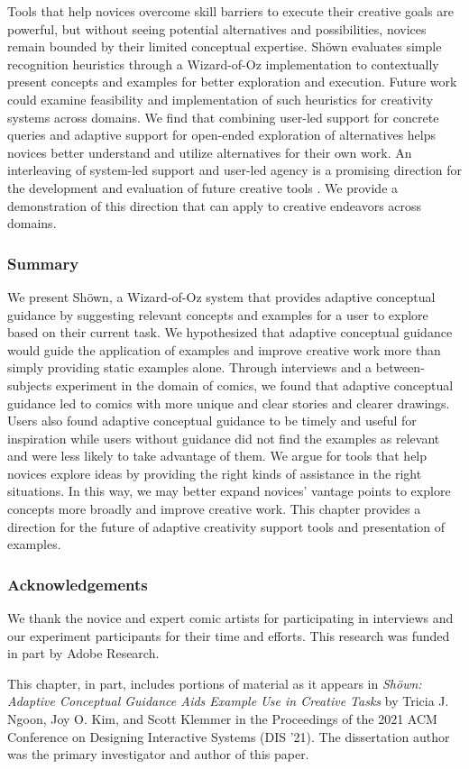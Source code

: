 Tools that help novices overcome skill barriers to execute their creative goals are powerful, but without seeing potential alternatives and possibilities, novices remain bounded by their limited conceptual expertise. Sh{\"o}wn evaluates simple recognition heuristics through a Wizard-of-Oz implementation to contextually present concepts and examples for better exploration and execution. Future work could examine feasibility and implementation of such heuristics for creativity systems across domains. We find that combining user-led support for concrete queries and adaptive support for open-ended exploration of alternatives helps novices better understand and utilize alternatives for their own work. An interleaving of system-led support and user-led agency is a promising direction for the development and evaluation of future creative tools \cite{Heer2019}. We provide a demonstration of this direction that can apply to creative endeavors across domains.

\subsubsection{Summary}
We present Sh{\"o}wn, a Wizard-of-Oz system that provides adaptive conceptual guidance by suggesting relevant concepts and examples for a user to explore based on their current task. We hypothesized that adaptive conceptual guidance would guide the application of examples and improve creative work more than simply providing static examples alone. Through interviews and a between-subjects experiment in the domain of comics, we found that adaptive conceptual guidance led to comics with more unique and clear stories and clearer drawings. Users also found adaptive conceptual guidance to be timely and useful for inspiration while users without guidance did not find the examples as relevant and were less likely to take advantage of them. We argue for tools that help novices explore ideas by providing the right kinds of assistance in the right situations. In this way, we may better expand novices' vantage points to explore concepts more broadly and improve creative work. This chapter provides a direction for the future of adaptive creativity support tools and presentation of examples.

\subsubsection{Acknowledgements}
We thank the novice and expert comic artists for participating in interviews and our experiment participants for their time and efforts. This research was funded in part by Adobe Research.

This chapter, in part, includes  portions of material as it appears in \textit{Sh\"{o}wn: Adaptive Conceptual Guidance Aids Example Use in Creative Tasks} by Tricia  J. Ngoon, Joy O. Kim, and Scott Klemmer in the Proceedings of the 2021 ACM Conference on Designing Interactive Systems (DIS '21). The dissertation author was the primary investigator and author of this paper.